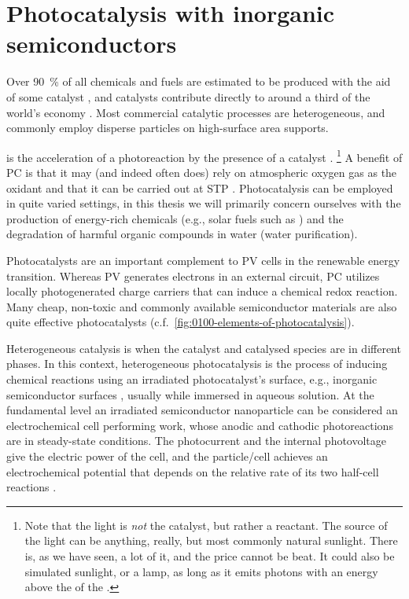 \documentclass[webedition,openright,titles,swedish,english]{LuaUUThesis}\usepackage[]{graphicx}\usepackage[]{xcolor}
\newcommand{\eg}{e.g.}
\newcommand{\cf}{c.f.}
\begin{document}
\section{Photocatalysis with inorganic semiconductors}
\label{intro:photocatalysis}

Over \qty{90}{\percent} of all chemicals and fuels are estimated to be produced
with the aid of some catalyst \cite{NilssonPingel2018}, and catalysts contribute directly
to around a third of the world's economy \cite{Ma2005}.
Most commercial catalytic processes are heterogeneous, and commonly employ disperse
particles on high-surface area supports.

 is the acceleration of a photoreaction
by the presence of a catalyst \cite{Mills1997,Suppan1994}.%
\footnote{%
   Note that the light is \emph{not} the catalyst, but rather a reactant.
   The source of the light can be anything, really, but most commonly
   natural sunlight. There is, as we have seen, a lot of it, and the
   price cannot be beat.
   It could also be simulated sunlight, or a lamp, as long as it emits
   photons with an energy above the  of
   the .}
A benefit of \gls{PC} is that it may (and indeed often does) rely
on atmospheric oxygen gas as the oxidant and that it can be carried out at
\gls{STP} \cite{Akyol2004}.
Photocatalysis can be employed in quite varied settings, in this thesis
we will primarily concern ourselves with the production of
energy-rich chemicals (\eg, solar fuels such as \hydrogen) and the degradation of
harmful organic compounds in water (water purification).

Photocatalysts are an important complement to \gls{PV} cells in the renewable
energy transition. Whereas \gls{PV} generates electrons in an external circuit,
\gls{PC} utilizes locally photogenerated charge carriers that can induce a chemical
redox reaction.
Many cheap, non-toxic and commonly available semiconductor materials are also
quite effective photocatalysts (\cf\ \cref{fig:0100-elements-of-photocatalysis}).

Heterogeneous catalysis is when the catalyst and catalysed species
are in different phases. In this context, heterogeneous photocatalysis is the process
of inducing chemical reactions using an irradiated photocatalyst's surface, \eg,
inorganic semiconductor surfaces \cite{Rajeshwar2015}, usually while immersed in
aqueous solution.
At the fundamental level an irradiated semiconductor nanoparticle can be considered
an electrochemical cell performing work, whose anodic and cathodic photoreactions
are in steady-state conditions. The photocurrent and the internal photovoltage
give the electric power of the cell, and the particle/cell achieves an
electrochemical potential that depends on the relative rate of its two half-cell
reactions \cite{Rajeshwar2015}.
\end{document}
